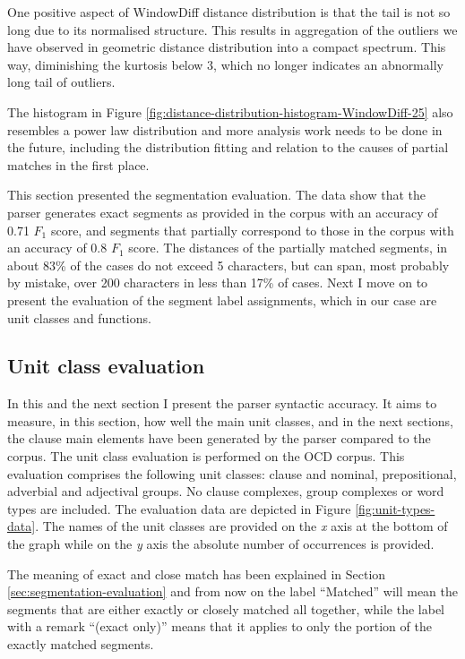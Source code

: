     One positive aspect of WindowDiff distance distribution is that the tail is not so long due to its normalised structure. This results in aggregation of the outliers we have observed in geometric distance distribution into a compact spectrum. This way, diminishing the kurtosis below 3, which no longer indicates an abnormally long tail of outliers. 
    
    The histogram in Figure \ref{fig:distance-distribution-histogram-WindowDiff-25} also resembles a power law distribution and more analysis work needs to be done in the future, including the distribution fitting and relation to the causes of partial matches in the first place. 
    
    This section presented the segmentation evaluation. The data show that the parser generates exact segments as provided in the corpus with an accuracy of 0.71 $F_1$ score, and segments that partially correspond to those in the corpus with an accuracy of 0.8 $F_1$ score. The distances of the partially matched segments, in about 83\% of the cases do not exceed 5 characters, but can span, most probably by mistake, over 200 characters in less than 17\% of cases. Next I move on to present the evaluation of the segment label assignments, which in our case are unit classes and functions.

\subsection{Unit class evaluation}
\label{sec:unit-class-evaluation}
    In this and the next section I present the parser syntactic accuracy. It aims to measure, in this section, how well the main unit classes, and in the next sections, the clause main elements have been generated by the parser compared to the corpus. The unit class evaluation is performed on the OCD corpus. This evaluation comprises the following unit classes: clause and nominal, prepositional, adverbial and adjectival groups. No clause complexes, group complexes or word types are included. The evaluation data are depicted in Figure \ref{fig:unit-types-data}. The names of the unit classes are provided on the \textit{x} axis at the bottom of the graph while on the \textit{y} axis the absolute number of occurrences is provided. 
    
    The meaning of exact and close match has been explained in Section \ref{sec:segmentation-evaluation} and from now on the label ``Matched'' will mean the segments that are either exactly or closely matched all together, while the label with a remark ``(exact only)'' means that it applies to only the portion of the exactly matched segments. 
    
